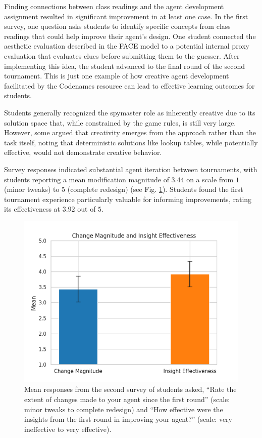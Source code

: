 \documentclass[phd,electronic,oneside,twosidetoc,letterpaper,chaptercenter,parttop,lof]{byumsphd}
\begin{document}
Finding connections between class readings and the agent development assignment resulted in significant improvement in at least one case. In the first survey, one question asks students to identify specific concepts from class readings that could help improve their agent’s design. One student connected the aesthetic evaluation described in the FACE model \cite{pease2011face} to a potential internal proxy evaluation that evaluates clues before submitting them to the guesser. After implementing this idea, the student advanced to the final round of the second tournament. This is just one example of how creative agent development facilitated by the Codenames resource can lead to effective learning outcomes for students.

Students generally recognized the spymaster role as inherently creative due to its solution space that, while constrained by the game rules, is still very large. However, some argued that creativity emerges from the approach rather than the task itself, noting that deterministic solutions like lookup tables, while potentially effective, would not demonstrate creative behavior.

Survey responses indicated substantial agent iteration between tournaments, with students reporting a mean modification magnitude of $3.44$ on a scale from $1$ (minor tweaks) to $5$ (complete redesign) (see Fig. \ref{fig:change_insight}). Students found the first tournament experience particularly valuable for informing improvements, rating its effectiveness at $3.92$ out of $5$.

\begin{figure}[tb]
    \centering
    \includegraphics[width=.75\linewidth]{images/codenames/change_insight.png}
    \caption[Student insight change]{Mean responses from the second survey of students asked, ``Rate the extent of changes made to your agent since the first round'' (scale: minor tweaks to complete redesign) and “How effective were the insights from the first round in improving your agent?” (scale: very ineffective to very effective).
}
    \label{fig:change_insight}
\end{figure}
\end{document}
